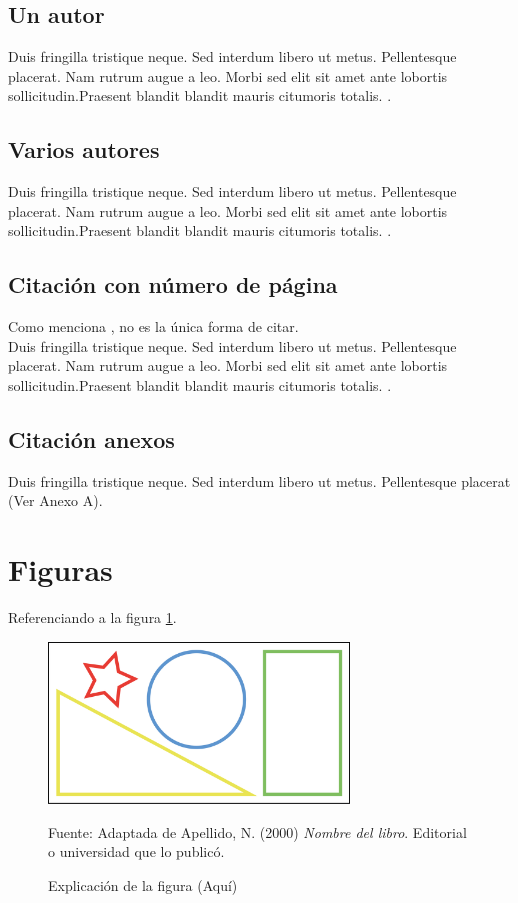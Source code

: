 \subsection*{Un autor}

Duis fringilla tristique neque. Sed interdum libero ut metus.
Pellentesque placerat. Nam rutrum augue a leo. Morbi sed 
elit sit amet ante lobortis sollicitudin.Praesent blandit 
blandit mauris citumoris totalis. \cite{libro:ejemplo}.

\subsection*{Varios autores}

Duis fringilla tristique neque. Sed interdum libero ut metus.
Pellentesque placerat. Nam rutrum augue a leo. Morbi sed 
elit sit amet ante lobortis sollicitudin.Praesent blandit 
blandit mauris citumoris totalis. \cite{libro:ejemplo_varios_autores}.

\subsection{Citación con número de página}

Como menciona , no es la única
forma de citar.\\

Duis fringilla tristique neque. Sed interdum libero ut metus.
Pellentesque placerat. Nam rutrum augue a leo. Morbi sed 
elit sit amet ante lobortis sollicitudin.Praesent blandit 
blandit mauris citumoris totalis. \cite[p.~7-12]{libro:ejemplo_varios_autores}.

\subsection{Citación anexos}
Duis fringilla tristique neque. Sed interdum libero ut metus.
Pellentesque placerat (Ver Anexo A).

\section{Figuras}
Referenciando a la figura \ref{fig:ejemplo}.

\begin{figure}[H]
    \begin{center}
        \includegraphics[width=8cm]{img/capitulo_1/figura_ejemplo.png}
    \end{center}
    \caption{Explicación de la figura (Aquí)}
    Fuente: Adaptada de Apellido, N. (2000) \textit{Nombre del libro}.
    Editorial o universidad que lo publicó.
    \label{fig:ejemplo}
\end{figure}

